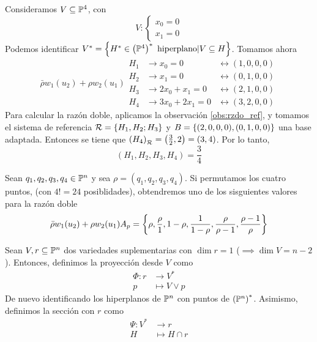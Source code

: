 \begin{example}
 Consideramos $V \subseteq \mathbb{P}^4$, con
 \[
  V : \begin{cases}
       x_0 = 0 \\ x_1 = 0
      \end{cases}
 \]
 Podemos identificar $V^* = \left\{H^* \in \left( \mathbb{P}^4 \right)^* \text{ hiperplano} \vert V \subseteq H\right\}$.
 Tomamos ahora
 \[\bar{\rho}w_1(u_2) +
      \rho w_2(u_1)
  \begin{aligned}
   H_1 &\rightarrow x_0 = 0 &\leftrightarrow (1,0,0,0) \\
   H_2 &\rightarrow x_1 = 0 &\leftrightarrow (0,1,0,0) \\
   H_3 &\rightarrow 2x_0+x_1 = 0 &\leftrightarrow (2,1,0,0) \\
   H_4 &\rightarrow 3x_0+2x_1 = 0 &\leftrightarrow (3,2,0,0)
  \end{aligned}
 \]
 Para calcular la razón doble, aplicamos la observación \ref{obs:rzdo_ref}, y tomamos el sistema
 de referencia $\mathcal{R} = \left\{H_1,H_2;H_3\right\}$ y $B = \left\{(2,0,0,0),(0,1,0,0)\right\}$ una base adaptada.
 Entonces se tiene que $\left( H_4 \right)_{\mathcal{R}} = \left( \frac{3}{2}, 2 \right) = (3,4)$. Por lo
 tanto,
 \[
  (H_1,H_2,H_3,H_4) = \frac{3}{4}
 \]
\end{example}

\begin{prop}
 Sean $q_1,q_2,q_3,q_4 \in \mathbb{P}^n$ y sea $\rho = (q_1,q_2,q_3,q_4)$. Si permutamos los cuatro
 puntos, (con $4! = 24$ posiblidades), obtendremos uno de los sisguientes valores para la
 razón doble
 \[\bar{\rho}w_1(u_2) +
      \rho w_2(u_1)
   A_p = \left\{\rho, \frac{\rho}{1}, 1-\rho, \frac{1}{1-\rho}, \frac{\rho}{\rho-1}, \frac{\rho-1}{\rho}\right\}
 \]

\end{prop}


\begin{defi}
 Sean $V,r \subseteq \mathbb{P}^n$ dos variedades suplementarias con $\dim r = 1$ ($\implies \dim V = n-2$).
 Entonces, definimos la proyección desde $V$ como
 \[
  \begin{aligned}
   \Phi \colon r &\to V^* \\ p &\mapsto V \vee p
  \end{aligned}
 \]
 De nuevo identificando los hiperplanos de $\mathbb{P}^n$ con puntos de $\left( \mathbb{P}^n \right)^*$. Asimismo,
 definimos la sección con $r$ como
 \[
  \begin{aligned}
   \Psi \colon V^* &\to r \\ H &\mapsto H \cap r
  \end{aligned}
 \]
\end{defi}

